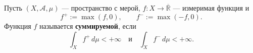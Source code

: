 \label{definition:25}

\begin{definition}
Пусть $(X,\mathcal A,\mu)$ --- пространство с мерой, $f:X\to\overline{\mathbb R}$ --- измеримая функция и
\[
  f^+:=\max(f,0),\qquad f^-:=\max(-f,0).
\]
Функция $f$ называется \textbf{суммируемой}, если
\[
  \int_X f^+\,d\mu<+\infty
  \quad\text{и}\quad
  \int_X f^-\,d\mu<+\infty.
\]
\end{definition}
